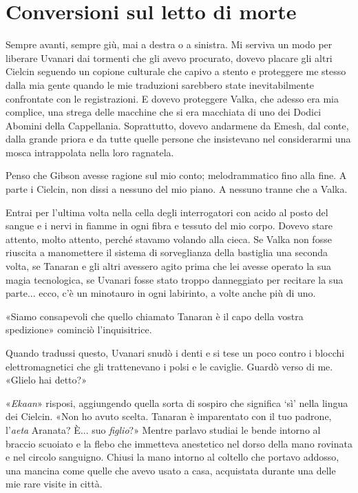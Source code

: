 \chapter{Conversioni sul letto di morte}

Sempre avanti, sempre giù, mai a destra o a sinistra. Mi serviva un modo
per liberare Uvanari dai tormenti che gli avevo procurato, dovevo
placare gli altri Cielcin seguendo un copione culturale che capivo a
stento e proteggere me stesso dalla mia gente quando le mie traduzioni
sarebbero state inevitabilmente confrontate con le registrazioni. E
dovevo proteggere Valka, che adesso era mia complice, una strega delle
macchine che si era macchiata di uno dei Dodici Abomini della
Cappellania. Soprattutto, dovevo andarmene da Emesh, dal conte, dalla
grande priora e da tutte quelle persone che insistevano nel considerarmi
una mosca intrappolata nella loro ragnatela.

Penso che Gibson avesse ragione sul mio conto; melodrammatico fino alla
fine. A parte i Cielcin, non dissi a nessuno del mio piano. A nessuno
tranne che a Valka.

Entrai per l'ultima volta nella cella degli interrogatori con acido al
posto del sangue e i nervi in fiamme in ogni fibra e tessuto del mio
corpo. Dovevo stare attento, molto attento, perché stavamo volando alla
cieca. Se Valka non fosse riuscita a manomettere il sistema di
sorveglianza della bastiglia una seconda volta, se Tanaran e gli altri
avessero agito prima che lei avesse operato la sua magia tecnologica, se
Uvanari fosse stato troppo danneggiato per recitare la sua parte...
ecco, c'è un minotauro in ogni labirinto, a volte anche più di uno.

«Siamo consapevoli che quello chiamato Tanaran è il capo della vostra
spedizione» cominciò l'inquisitrice.

Quando tradussi questo, Uvanari snudò i denti e si tese un poco contro i
blocchi elettromagnetici che gli trattenevano i polsi e le caviglie.
Guardò verso di me. «Glielo hai detto?»

«\emph{Ekaan}» risposi, aggiungendo quella sorta di sospiro che
significa `sì' nella lingua dei Cielcin. «Non ho avuto scelta. Tanaran è
imparentato con il tuo padrone, l'\emph{aeta} Aranata? È... suo
\emph{figlio}?» Mentre parlavo studiai le bende intorno al braccio
scuoiato e la flebo che immetteva anestetico nel dorso della mano
rovinata e nel circolo sanguigno. Chiusi la mano intorno al coltello che
portavo addosso, una mancina come quelle che avevo usato a casa,
acquistata durante una delle mie rare visite in città.

